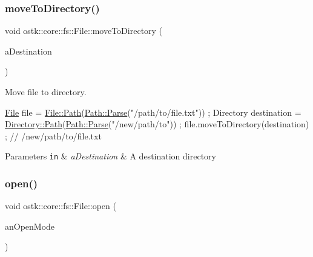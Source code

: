 \subsubsection{\texorpdfstring{move\+To\+Directory()}{moveToDirectory()}}
{\footnotesize\ttfamily void ostk\+::core\+::fs\+::\+File\+::move\+To\+Directory (\begin{DoxyParamCaption}\item[{const \hyperlink{classostk_1_1core_1_1fs_1_1_directory}{fs\+::\+Directory} \&}]{a\+Destination }\end{DoxyParamCaption})}



Move file to directory. 


\begin{DoxyCode}
\hyperlink{classostk_1_1core_1_1fs_1_1_file_ad1695224996950be9962b8457da369b3}{File} file = \hyperlink{classostk_1_1core_1_1fs_1_1_file_ad677c6a3edc1e88c18226edebff1da03}{File::Path}(\hyperlink{classostk_1_1core_1_1fs_1_1_path_ad08539ba654f5df11c4bcb07276345ad}{Path::Parse}(\textcolor{stringliteral}{"/path/to/file.txt"})) ;
Directory destination = \hyperlink{classostk_1_1core_1_1fs_1_1_directory_a0151dba2940d5f426b52209dc7dab2e5}{Directory::Path}(\hyperlink{classostk_1_1core_1_1fs_1_1_path_ad08539ba654f5df11c4bcb07276345ad}{Path::Parse}(\textcolor{stringliteral}{"/new/path/to"})) ;
file.moveToDirectory(destination) ; \textcolor{comment}{// /new/path/to/file.txt}
\end{DoxyCode}



\begin{DoxyParams}[1]{Parameters}
\mbox{\tt in}  & {\em a\+Destination} & A destination directory \\
\hline
\end{DoxyParams}
\mbox{\label{classostk_1_1core_1_1fs_1_1_file_a3d5b7ddfa15dde13573f904900cd84e6}} 
\subsubsection{\texorpdfstring{open()}{open()}}
{\footnotesize\ttfamily void ostk\+::core\+::fs\+::\+File\+::open (\begin{DoxyParamCaption}\item[{const \hyperlink{classostk_1_1core_1_1fs_1_1_file_aef3d3e622ef15381a9f48c161e134da5}{File\+::\+Open\+Mode} \&}]{an\+Open\+Mode }\end{DoxyParamCaption})}



